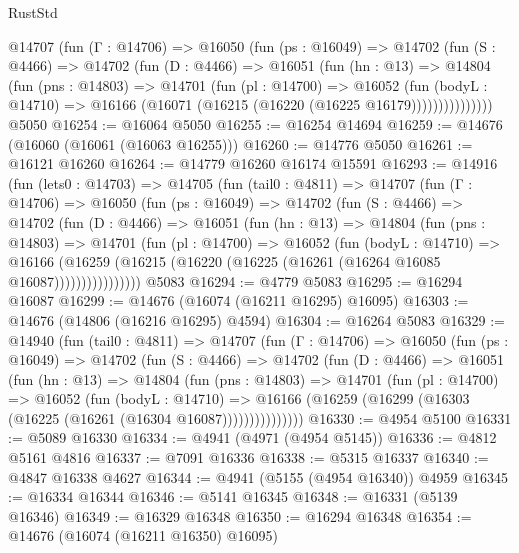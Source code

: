 \begin{lexlean}{RustStd}
\begin{coremodule}
        @14707
          (fun (Γ : @14706) =>
          @16050
            (fun (ps : @16049) =>
            @14702
              (fun (S : @4466) =>
              @14702
                (fun (D : @4466) =>
                @16051
                  (fun (hn : @13) =>
                  @14804
                    (fun (pns : @14803) =>
                    @14701
                      (fun (pl : @14700) =>
                      @16052
                        (fun (bodyL : @14710) =>
                        @16166 (@16071 (@16215 (@16220 (@16225 @16179)))))))))))))))
    @5050
@16254 := @16064 @5050
@16255 := @16254 @14694
@16259 := @14676 (@16060 (@16061 (@16063 @16255)))
@16260 := @14776 @5050
@16261 := @16121 @16260
@16264 := @14779 @16260 @16174 @15591
@16293 := @14916
    (fun (lets0 : @14703) =>
    @14705
      (fun (tail0 : @4811) =>
      @14707
        (fun (Γ : @14706) =>
        @16050
          (fun (ps : @16049) =>
          @14702
            (fun (S : @4466) =>
            @14702
              (fun (D : @4466) =>
              @16051
                (fun (hn : @13) =>
                @14804
                  (fun (pns : @14803) =>
                  @14701
                    (fun (pl : @14700) =>
                    @16052
                      (fun (bodyL : @14710) =>
                      @16166
                        (@16259
                          (@16215 (@16220 (@16225 (@16261 (@16264 @16085 @16087))))))))))))))))
    @5083
@16294 := @4779 @5083
@16295 := @16294 @16087
@16299 := @14676 (@16074 (@16211 @16295) @16095)
@16303 := @14676 (@14806 (@16216 @16295) @4594)
@16304 := @16264 @5083
@16329 := @14940
    (fun (tail0 : @4811) =>
    @14707
      (fun (Γ : @14706) =>
      @16050
        (fun (ps : @16049) =>
        @14702
          (fun (S : @4466) =>
          @14702
            (fun (D : @4466) =>
            @16051
              (fun (hn : @13) =>
              @14804
                (fun (pns : @14803) =>
                @14701
                  (fun (pl : @14700) =>
                  @16052
                    (fun (bodyL : @14710) =>
                    @16166 (@16259 (@16299 (@16303 (@16225 (@16261 (@16304 @16087)))))))))))))))
@16330 := @4954 @5100
@16331 := @5089 @16330
@16334 := @4941 (@4971 (@4954 @5145))
@16336 := @4812 @5161 @4816
@16337 := @7091 @16336
@16338 := @5315 @16337
@16340 := @4847 @16338 @4627
@16344 := @4941 (@5155 (@4954 @16340)) @4959
@16345 := @16334 @16344
@16346 := @5141 @16345
@16348 := @16331 (@5139 @16346)
@16349 := @16329 @16348
@16350 := @16294 @16348
@16354 := @14676 (@16074 (@16211 @16350) @16095)

\end{coremodule}
\end{lexlean}
